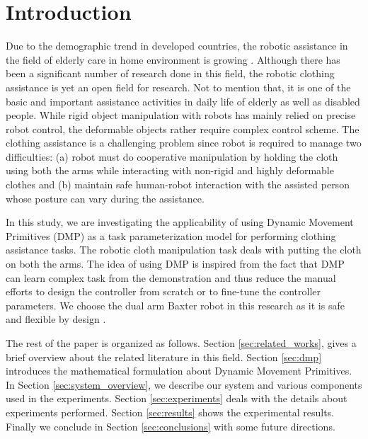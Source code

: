 \documentclass[sigconf]{acmart}
\begin{document}
\section{Introduction}
\label{sec:introduction}
Due to the demographic trend in developed countries, the robotic assistance in the field of elderly care in home environment is growing \cite{broekens2009assistive}. Although there has been a significant number of research done in this field, the robotic clothing assistance is yet an open field for research. Not to mention that, it is one of the basic and important assistance activities in daily life of elderly as well as disabled people. While rigid object manipulation with robots has mainly relied on precise robot control, the deformable objects rather require complex control scheme. The clothing assistance is a challenging problem since robot is required to manage two difficulties: (a) robot must do cooperative manipulation by holding the cloth using both the arms while interacting with non-rigid and highly deformable clothes and (b) maintain safe human-robot interaction with the assisted person whose posture can vary during the assistance.

In this study, we are investigating the applicability of using Dynamic Movement Primitives (DMP) as a task parameterization model for performing clothing assistance tasks. The robotic cloth manipulation task deals with putting the cloth on both the arms. The idea of using DMP is inspired from the fact that DMP can learn complex task from the demonstration \cite{ijspeert2003learning, schaal2006dynamic, ijspeert2013dynamical} and thus reduce the manual efforts to design the controller from scratch or to fine-tune the controller parameters. We choose the dual arm Baxter robot in this research as it is safe and flexible by design \cite{fitzgerald2013developing}.

The rest of the paper is organized as follows. Section \ref{sec:related_works}, gives a brief overview about the related literature in this field. Section \ref{sec:dmp} introduces the mathematical formulation about Dynamic Movement Primitives. In Section \ref{sec:system_overview}, we describe our system and various components used in the experiments. Section \ref{sec:experiments} deals with the details about experiments performed. Section \ref{sec:results} shows the experimental results. Finally we conclude in Section \ref{sec:conclusions} with some future directions.
\end{document}
